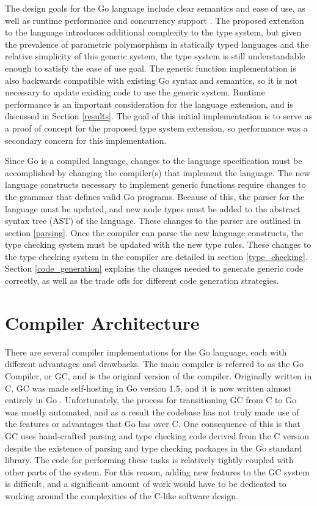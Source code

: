 \documentclass[letterpaper,twocolumn,11pt]{article}
\begin{document}
The design goals for the Go language include clear semantics and ease of use, as well as runtime performance and concurrency support \cite{godesign}. The proposed extension to the language introduces additional complexity to the type system, but given the prevalence of parametric polymorphism in statically typed languages and the relative simplicity of this generic system, the type system is still understandable enough to satisfy the ease of use goal. The generic function implementation is also backwards compatible with existing Go syntax and semantics, so it is not necessary to update existing code to use the generic system. Runtime performance is an important consideration for the language extension, and is discussed in Section \ref{results}. The goal of this initial implementation is to serve as a proof of concept for the proposed type system extension, so performance was a secondary concern for this implementation.

Since Go is a compiled language, changes to the language specification must be accomplished by changing the compiler(s) that implement the language. The new language constructs necessary to implement generic functions require changes to the grammar that defines valid Go programs. Because of this, the parser for the language must be updated, and new node types must be added to the abstract syntax tree (AST) of the language. These changes to the parser are outlined in section \ref{parsing}. Once the compiler can parse the new language constructs, the type checking system must be updated with the new type rules. These changes to the type checking system in the compiler are detailed in section \ref{type_checking}. Section \ref{code_generation} explains the changes needed to generate generic code correctly, as well as the trade offs for different code generation strategies. 

\section{Compiler Architecture} \label{architecture}

There are several compiler implementations for the Go language, each with different advantages and drawbacks. The main compiler is referred to as the Go Compiler, or GC, and is the original version of the compiler. Originally written in C, GC was made self-hosting in Go version 1.5, and it is now written almost entirely in Go \cite{goselfhost}. Unfortunately, the process for transitioning GC from C to Go was mostly automated, and as a result the codebase has not truly made use of the features or advantages that Go has over C. One consequence of this is that GC uses hand-crafted parsing and type checking code derived from the C version despite the existence of parsing and type checking packages in the Go standard library. The code for performing these tasks is relatively tightly coupled with other parts of the system. For this reason, adding new features to the GC system is difficult, and a significant amount of work would have to be dedicated to working around the complexities of the C-like software design.
\end{document}
